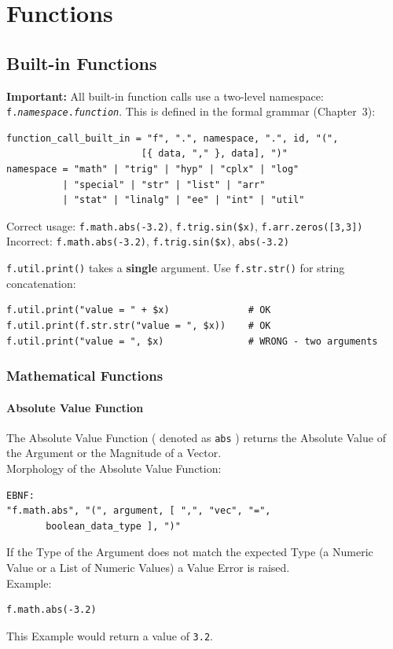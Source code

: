 \chapter{Functions}
\section{Built-in Functions}

\textbf{Important:} All built-in function calls use a two-level namespace: \texttt{f.\textit{namespace}.\textit{function}}. This is defined in the formal grammar (Chapter~3):
\begin{verbatim}
function_call_built_in = "f", ".", namespace, ".", id, "(",
                        [{ data, "," }, data], ")"
namespace = "math" | "trig" | "hyp" | "cplx" | "log"
          | "special" | "str" | "list" | "arr"
          | "stat" | "linalg" | "ee" | "int" | "util"
\end{verbatim}
Correct usage: \texttt{f.math.abs(-3.2)}, \texttt{f.trig.sin(\$x)}, \texttt{f.arr.zeros([3,3])}\\
Incorrect: \texttt{f.math.abs(-3.2)}, \texttt{f.trig.sin(\$x)}, \texttt{abs(-3.2)}

\texttt{f.util.print()} takes a \textbf{single} argument. Use \texttt{f.str.str()} for string concatenation:
\begin{verbatim}
f.util.print("value = " + $x)              # OK
f.util.print(f.str.str("value = ", $x))    # OK
f.util.print("value = ", $x)               # WRONG - two arguments
\end{verbatim}

\subsection{Mathematical Functions}
\subsubsection{Absolute Value Function}
The Absolute Value Function ( denoted as \texttt{abs} ) returns the Absolute Value of the Argument or the Magnitude of a Vector. \\
Morphology of the Absolute Value Function:
\begin{verbatim}
EBNF:
"f.math.abs", "(", argument, [ ",", "vec", "=", 
       boolean_data_type ], ")"
\end{verbatim}
If the Type of the Argument does not match the expected Type (a Numeric Value or a List of Numeric Values) a Value Error is raised.\\
Example:
\begin{verbatim}
f.math.abs(-3.2)
\end{verbatim}
This Example would return a value of \texttt{3.2}.

